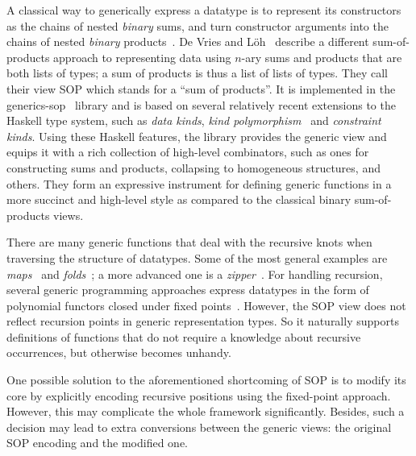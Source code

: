 \documentclass[sigplan,screen,review,anonymous]{acmart}
\begin{document}
A classical way to generically express a datatype is to represent its constructors as the chains of nested \emph{binary} sums, and turn constructor arguments into the chains of nested \emph{binary} products~\cite{VanNoort2008,Cheney2002,Loeh2004}\nocite{Rodriguez2008}\nocite{Magalhaes2012}. De Vries and L\"{o}h~\cite{VriLoeh2014} describe a different sum-of-products approach to representing data using $n$-ary sums and products that are both lists of types; a sum of products is thus a list of lists of types. They call their view SOP which stands for a ``sum of products''. It is implemented in the \textsf{generics-sop}~\cite{generics-sop} library and is based on several relatively recent extensions to the Haskell type system, such as \emph{data kinds}, \emph{kind polymorphism}~\cite{Yorgey2012} and \emph{constraint kinds}.
Using these Haskell features, the library provides the generic view and equips it with a rich collection of high-level combinators, such as ones for constructing sums and products, collapsing to homogeneous structures, and others. They form an expressive instrument for defining generic functions in a more succinct and high-level style as compared to the classical binary sum-of-products views.

There are many generic functions that deal with the recursive knots when traversing the structure of datatypes. Some of the most general examples are \emph{maps}~\cite{Magalhaes2010} and \emph{folds}~\cite{Meijer1991}; a more advanced one is a \emph{zipper}~\cite{Huet1997,HiJeLo2004,Adams2010}. For handling recursion, several generic programming approaches express datatypes in the form of polynomial functors closed under fixed points~\cite{MuRec2009,Jansson1997,Loeh2011}. However, the SOP view does not reflect recursion points in generic representation types. So it naturally supports definitions of functions that do not require a knowledge about recursive occurrences, but otherwise becomes unhandy.

One possible solution to the aforementioned shortcoming of SOP is to modify its core by explicitly encoding recursive positions using the fixed-point approach. However, this may complicate the whole framework significantly. Besides, such a decision may lead to extra conversions between the generic views: the original SOP encoding and the modified one.
\end{document}
